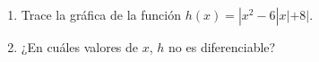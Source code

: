 \item \par
\begin{enumerate}
    \item[(a)] Trace la gráfica de la función $h(x) = |x^2 - 6|x| + 8|$.
    \item[(b)] ¿En cuáles valores de $x$, $h$ no es diferenciable?
\end{enumerate}
